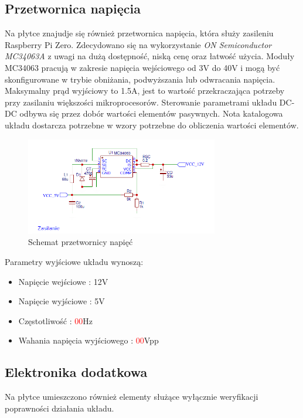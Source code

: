 \documentclass[12pt, eng, twoside, openany, final]{mgr}
\begin{document}
        \subsection{Przetwornica napięcia}
        Na płytce znajudje się również przetwornica napięcia, która służy zasileniu Raspberry Pi Zero. Zdecydowano się na wykorzystanie \emph{ON Semiconductor MC34063A} z uwagi na dużą dostępność, niską cenę oraz łatwość użycia. Moduły MC34063 pracują w zakresie napięcia wejściowego od 3V do 40V i mogą być skonfigurowane w trybie obniżania, podwyższania lub odwracania napięcia. Maksymalny prąd wyjściowy to 1.5A, jest to wartość przekraczająca potrzeby przy zasilaniu większości mikroprocesorów. Sterowanie parametrami układu DC-DC odbywa się przez dobór wartości elementów pasywnych. Nota katalogowa układu dostarcza potrzebne w wzory potrzebne do obliczenia wartości elementów.
                \begin{figure}[H]
                \begin{center}
                    \includegraphics[width=0.75\textwidth]{psu.png}
                    \caption{Schemat przetwornicy napięć}
                \end{center}
                \end{figure}
                
        Parametry wyjściowe układu wynoszą:
        \begin{itemize}
            \item Napięcie wejściowe : 12V
            \item Napięcie wyjściowe : 5V
            \item Częstotliwość      :  \textcolor{red}{00}Hz 
            \item Wahania napięcia wyjściowego :  \textcolor{red}{00}Vpp 
        \end{itemize}
                
        \subsection{Elektronika dodatkowa}
        Na płytce umieszczono również elementy służące wyłącznie weryfikacji poprawności działania układu.
        
\end{document}
